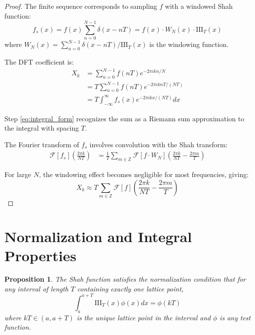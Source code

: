 \documentclass{article}
\newtheorem{proposition}{Proposition}
\begin{document}
\begin{proof}
The finite sequence corresponds to sampling $f$ with a windowed Shah function:
\begin{equation}
\label{eq:windowed_sampling}
f_s(x) = f(x) \sum_{n=0}^{N-1} \delta(x - nT) = f(x) \cdot W_N(x) \cdot \text{III}_T(x)
\end{equation}
where $W_N(x) = \sum_{n=0}^{N-1} \delta(x - nT) / \text{III}_T(x)$ is the windowing function.

The DFT coefficient is:
\begin{align}
X_k &= \sum_{n=0}^{N-1} f(nT) e^{-2\pi i kn/N} \label{eq:dft_definition}\\
&= T \sum_{n=0}^{N-1} f(nT) e^{-2\pi i knT/(NT)} \label{eq:factor_T}\\
&= T \int_{-\infty}^{\infty} f_s(x) e^{-2\pi i kx/(NT)} dx \label{eq:integral_form}
\end{align}

Step \eqref{eq:integral_form} recognizes the sum as a Riemann sum approximation to the integral with spacing $T$.

The Fourier transform of $f_s$ involves convolution with the Shah transform:
\begin{align}
\mathcal{F}[f_s]\left(\frac{2\pi k}{NT}\right) &= \frac{1}{T} \sum_{m \in \mathbb{Z}} \mathcal{F}[f \cdot W_N]\left(\frac{2\pi k}{NT} - \frac{2\pi m}{T}\right) \label{eq:sampling_effect}
\end{align}

For large $N$, the windowing effect becomes negligible for most frequencies, giving:
\begin{equation}
\label{eq:asymptotic_dft}
X_k \approx T \sum_{m \in \mathbb{Z}} \mathcal{F}[f]\left(\frac{2\pi k}{NT} - \frac{2\pi m}{T}\right)
\end{equation}
\end{proof}

\section{Normalization and Integral Properties}

\begin{proposition}
\label{prop:shah_normalization}
The Shah function satisfies the normalization condition that for any interval of length $T$ containing exactly one lattice point,
\begin{equation}
\label{eq:shah_integral}
\int_{a}^{a+T} \text{III}_T(x) \phi(x) dx = \phi(kT)
\end{equation}
where $kT \in (a, a+T)$ is the unique lattice point in the interval and $\phi$ is any test function.
\end{proposition}
\end{document}
